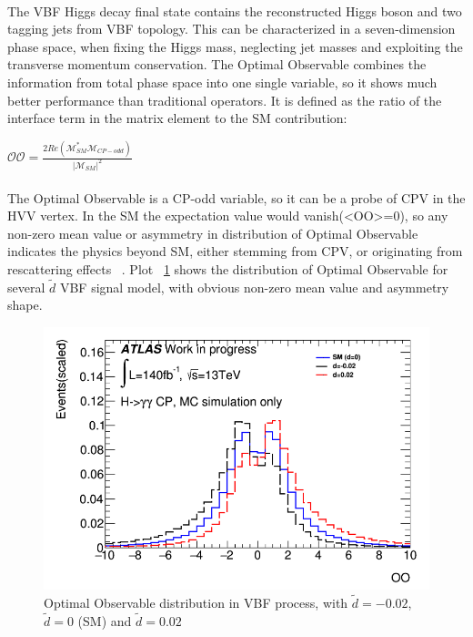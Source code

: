\paragraph{}The VBF Higgs decay final state contains the reconstructed Higgs boson and two tagging jets from VBF topology. This can be characterized in a seven-dimension phase space, when fixing the Higgs mass, neglecting jet masses and exploiting the transverse momentum conservation. The Optimal Observable combines the information from total phase space into one single variable, so it shows much better performance than traditional operators. It is defined as the ratio of the interface term in the matrix element to the SM contribution: 

\begin{center}
\begin{math}
\mathcal{OO} = \frac{2Re(\mathcal{M}^{\ast}_{SM} \mathcal{M}_{CP-odd})}{|\mathcal{M}_{SM}|^2}
\end{math}
\end{center}


\paragraph{}The Optimal Observable is a CP-odd variable, so it can be a probe of CPV in the HVV vertex. In the SM the expectation value would vanish(<OO>=0), so any non-zero mean value or asymmetry in distribution of Optimal Observable indicates the physics beyond SM, either stemming from CPV, or originating from rescattering effects ~\cite{Brehmer_2018}. Plot ~\ref{fig:OOwithd} shows the distribution of Optimal Observable for several $\tilde{d}$ VBF signal model, with obvious non-zero mean value and asymmetry shape. 

\begin{figure}[h]
	\centering
	\includegraphics[width=.7\textwidth]{figure/OOind.png}
	\caption{Optimal Observable distribution in VBF process, with $\tilde{d}=-0.02$, $\tilde{d}=0$ (SM) and $\tilde{d}=0.02$}
	\label{fig:OOwithd}
\end{figure}

